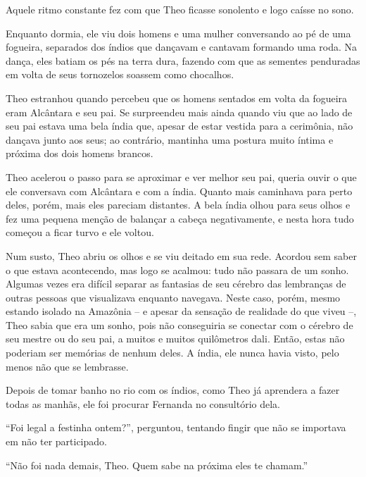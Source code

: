 \asterisc


Aquele ritmo constante fez com que Theo ficasse sonolento e logo caísse
no sono.

Enquanto dormia, ele viu dois homens e uma mulher conversando ao pé de
uma fogueira, separados dos índios que dançavam e cantavam formando uma
roda. Na dança, eles batiam os pés na terra dura, fazendo com que as
sementes penduradas em volta de seus tornozelos soassem como chocalhos.

Theo estranhou quando percebeu que os homens sentados em volta da
fogueira eram Alcântara e seu pai. Se surpreendeu mais ainda
quando viu que ao lado de seu pai estava uma bela índia que, apesar
de estar vestida para a cerimônia, não dançava junto aos seus; ao
contrário, mantinha uma postura muito íntima e próxima dos dois homens
brancos.

Theo acelerou o passo para se aproximar e ver melhor seu pai, queria
ouvir o que ele conversava com Alcântara e com a índia. Quanto mais
caminhava para perto deles, porém, mais eles pareciam distantes. A bela
índia olhou para seus olhos e fez uma pequena menção de balançar a cabeça
negativamente, e nesta hora tudo começou a ficar turvo e ele voltou.

Num susto, Theo abriu os olhos e se viu
deitado em sua rede. Acordou sem saber o que estava acontecendo, mas
logo se acalmou: tudo não passara de um sonho.
Algumas vezes era difícil separar as fantasias de seu cérebro das
lembranças de outras pessoas que visualizava enquanto navegava. Neste
caso, porém, mesmo estando isolado na Amazônia -- e apesar da sensação
de realidade do que viveu --, Theo sabia que era um sonho, pois não
conseguiria se conectar com
o cérebro de seu mestre ou do seu pai, a muitos e muitos quilômetros
dali. Então, estas não poderiam ser memórias de nenhum deles. A
índia, ele nunca havia visto, pelo menos não que se lembrasse.

\asterisc


Depois de tomar banho no rio com os índios, como Theo já aprendera a
fazer todas as manhãs, ele foi procurar Fernanda no consultório dela.

``Foi legal a festinha ontem?'', perguntou, tentando fingir que não se
importava em não ter participado.

``Não foi nada demais, Theo. Quem sabe na próxima eles te chamam.''

